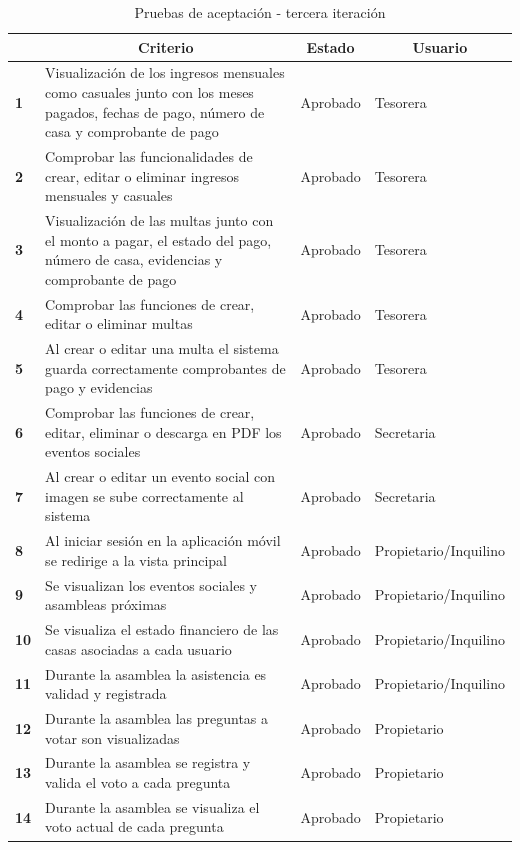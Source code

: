 \begin{spacing}{1}
    \begin{center}


    \renewcommand*{\arraystretch}{1.4}
    \begin{longtable}{ |>{\bfseries}l|p{}|l|l| }
        \caption{Pruebas de aceptación - tercera iteración}\\
        \hline
        \multicolumn{1}{|c|}{ \textbf{N.}} & \multicolumn{1}{c|}{\textbf{Criterio}} & \multicolumn{1}{c|}{ \textbf{Estado}} & \multicolumn{1}{c|}{ \textbf{Usuario}}\\
        \hline
        1 & Visualización de los ingresos mensuales como casuales junto con los meses pagados, fechas de pago, número de casa y comprobante de pago & Aprobado & Tesorera\\
        \hline
        2 & Comprobar las funcionalidades de crear, editar o eliminar ingresos mensuales y casuales & Aprobado & Tesorera\\
        \hline
        3 & Visualización de las multas junto con el monto a pagar, el estado del pago, número de casa, evidencias y comprobante de pago & Aprobado & Tesorera\\
        \hline
        4 & Comprobar las funciones de crear, editar o eliminar multas & Aprobado & Tesorera\\
        \hline
        5 & Al crear o editar una multa el sistema guarda correctamente comprobantes de pago y evidencias & Aprobado & Tesorera\\
        \hline
        6 & Comprobar las funciones de crear, editar, eliminar o descarga en PDF los eventos sociales  & Aprobado & Secretaria\\
        \hline
        7 & Al crear o editar un evento social con imagen se sube correctamente al sistema  & Aprobado & Secretaria\\
        \hline
        8 & Al iniciar sesión en la aplicación móvil se redirige a la vista principal & Aprobado & Propietario/Inquilino\\
        \hline
        9 & Se visualizan los eventos sociales y asambleas próximas & Aprobado & Propietario/Inquilino\\
        \hline
        10 & Se visualiza el estado financiero de las casas asociadas a cada usuario & Aprobado & Propietario/Inquilino\\
        \hline
        11 & Durante la asamblea la asistencia es validad y registrada & Aprobado & Propietario/Inquilino\\
        \hline
        12 & Durante la asamblea las preguntas a votar son visualizadas & Aprobado & Propietario\\
        \hline
        13 & Durante la asamblea se registra y valida el voto a cada pregunta & Aprobado & Propietario\\
        \hline
        14 & Durante la asamblea se visualiza el voto actual de cada pregunta & Aprobado & Propietario\\
        \hline
    \end{longtable}\label{tab:pruebas-aceptacion-3}
    \end{center}
\end{spacing}

